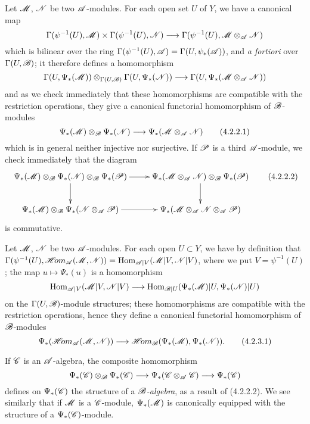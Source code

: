 \begin{env}[4.2.2]
\label{0.4.2.2}
Let $\mathscr{M}$, $\mathscr{N}$ be two $\mathscr{A}$-modules. For each open set $U$ of $Y$, we
have a canonical map
\[
  \Gamma(\psi^{-1}(U),\sh{M})\times\Gamma(\psi^{-1}(U),\sh{N})
  \to\Gamma(\psi^{-1}(U),\sh{M}\otimes_\sh{A}\sh{N})
\]
which is bilinear over the ring
$\Gamma(\psi^{-1}(U),\mathscr{A})=\Gamma(U,\psi_*(\mathscr{A}))$, and \emph{a fortiori}
over $\Gamma(U,\mathscr{B})$; it therefore defines a homomorphism
\[
  \Gamma(U,\Psi_*(\sh{M}))\otimes_{\Gamma(U,\sh{B})}\Gamma(U,\Psi_*(\sh{N}))
  \to\Gamma(U,\Psi_*(\sh{M}\otimes_\sh{A}\sh{N}))
\]
and as we check immediately that these homomorphisms are compatible with the
restriction operations, they give a canonical functorial homomorphism of
$\mathscr{B}$-modules
\[
  \Psi_*(\sh{M})\otimes_\sh{B}\Psi_*(\sh{N})
  \to\Psi_*(\sh{M}\otimes_\sh{A}\sh{N})
  \tag{4.2.2.1}
\]
which is in general neither injective nor surjective. If $\mathscr{P}$ is a third
$\mathscr{A}$-module, we check immediately that the diagram
\[
  \xymatrix{
    \Psi_*(\sh{M})\otimes_\sh{B}\Psi_*(\sh{N})\otimes_\sh{B}\Psi_*(\sh{P})\ar[r]\ar[d]
    & \Psi_*(\sh{M}\otimes_\sh{A}\sh{N})\otimes_\sh{B}\Psi_*(\sh{P})\ar[d]\\
    \Psi_*(\sh{M})\otimes_\sh{B}\Psi_*(\sh{N}\otimes_\sh{A}\sh{P})\ar[r]
    & \Psi_*(\sh{M}\otimes_\sh{A}\sh{N}\otimes_\sh{A}\sh{P})
  }
  \tag{4.2.2.2}
\]
is commutative.
\end{env}

\begin{env}[4.2.3]
\label{0.4.2.3}
Let $\mathscr{M}$, $\mathscr{N}$ be two $\mathscr{A}$-modules. For each open $U\subset Y$, we
have by definition that
$\Gamma(\psi^{-1}(U),\mathscr{H}\!{om}_\mathscr{A}(\mathscr{M},\mathscr{N}))
  ={\mathop{\mathrm{Hom}}\nolimits}_{\mathscr{A}|V}(\mathscr{M}|V,\mathscr{N}|V)$, where we put $V=\psi^{-1}(U)$; the map
$u\mapsto\Psi_*(u)$ is a homomorphism
\[
  \Hom_{\sh{A}|V}(\sh{M}|V,\sh{N}|V)
  \to\Hom_{\sh{B}|U}(\Psi_*(\sh{M})|U,\Psi_*(\sh{N})|U)
\]
on the $\Gamma(U,\mathscr{B})$-module structures; these homomorphisms are compatible
with the restriction operations, hence they define a canonical functorial
homomorphism of $\mathscr{B}$-modules
\[
  \Psi_*(\shHom_\sh{A}(\sh{M},\sh{N}))
  \to\shHom_\sh{B}(\Psi_*(\sh{M}),\Psi_*(\sh{N})).
  \tag{4.2.3.1}
\]
\end{env}

\begin{env}[4.2.4]
\label{0.4.2.4}
If $\mathscr{C}$ is an $\mathscr{A}$-algebra, the composite homomorphism
\[
  \Psi_*(\sh{C})\otimes_\sh{B}\Psi_*(\sh{C})
  \to\Psi_*(\sh{C}\otimes_\sh{A}\sh{C})
  \to\Psi_*(\sh{C})
\]
defines on $\Psi_*(\mathscr{C})$ the structure of a \emph{$\mathscr{B}$-algebra}, as a
result of (4.2.2.2). We see similarly that if $\mathscr{M}$ is a $\mathscr{C}$-module,
$\Psi_*(\mathscr{M})$ is canonically equipped with the structure of a
$\Psi_*(\mathscr{C})$-module.
\end{env}

